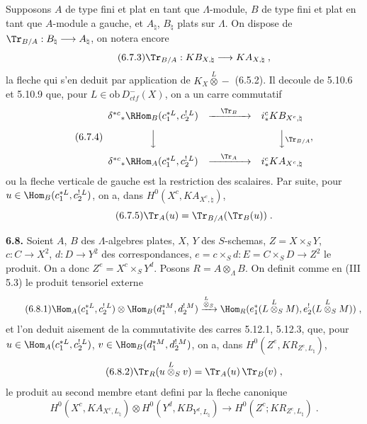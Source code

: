 Supposons $A$ de type fini et plat en tant que $\Lambda$-module, $B$ de type fini et plat en tant que $A$-module a gauche, et $A_\natural$, $B_\natural$ plats sur $\Lambda$. On dispose de $\Tr_{B/A} : B_\natural \longrightarrow A_\natural$, on notera encore
\begin{equation}\tag{6.7.3}
\Tr_{B/A} : KB_{X,\natural} \longrightarrow KA_{X,\natural}\;,
\end{equation}
la fleche qui s'en deduit par application de $K_X \overset{L}{\otimes} -$ (6.5.2). Il decoule de 5.10.6 et 5.10.9 que, pour $L \in \mathrm{ob}\, D_{ctf}^-(X)$, on a un carre commutatif
\begin{equation}\tag{6.7.4}
\begin{array}{ccc}
\delta^{*c}{}_*\RHom_B(c_1^{*L}, c_2^{!\,L}) & \xrightarrow{\quad\Tr_B\quad} & i_*^c KB_{X^c,\natural} \\[8pt]
\Big\downarrow & & \Big\downarrow \rlap{$\scriptstyle\Tr_{B/A}$} \\[8pt]
\delta^{*c}{}_*\RHom_A(c_1^{*L}, c_2^{!\,L}) & \xrightarrow{\quad\Tr_A\quad} & i_*^c KA_{X^c,\natural}
\end{array}\;,
\end{equation}
ou la fleche verticale de gauche est la restriction des scalaires. Par suite, pour $u \in \Hom_B(c_1^{*L}, c_2^{!\,L})$, on a, dans $H^0(X^c, KA_{X^c,\natural})$,
\begin{equation}\tag{6.7.5}
\Tr_A(u) = \Tr_{B/A}(\Tr_B(u))\;.
\end{equation}

\medskip
\noindent\textbf{6.8.} Soient $A$, $B$ des $\Lambda$-algebres plates, $X$, $Y$ des $S$-schemas, $Z = X \times_S Y$, $c : C \longrightarrow X^2$, $d : D \longrightarrow Y^2$ des correspondances, $e = c \times_S d : E = C \times_S D \rightarrow Z^2$ le produit. On a donc $Z^e = X^c \times_S Y^d$. Posons $R = A \otimes_\Lambda B$. On definit comme en (III 5.3) le produit tensoriel externe
\begin{equation}\tag{6.8.1}
\Hom_A(c_1^{*L}, c_2^{!\,L}) \otimes \Hom_B(d_1^{*M}, d_2^{!\,M}) \xrightarrow{\overset{L}{\otimes}_S} \Hom_R(e_1^{*}(L \overset{L}{\otimes}_S M), e_2^{!\,}(L \overset{L}{\otimes}_S M))\;,
\end{equation}
et l'on deduit aisement de la commutativite des carres 5.12.1, 5.12.3, que, pour $u \in \Hom_A(c_1^{*L}, c_2^{!\,L})$, $v \in \Hom_B(d_1^{*M}, d_2^{!\,M})$, on a, dans $H^0(Z^e, KR_{Z^c,L_\natural})$,
\begin{equation}\tag{6.8.2}
\Tr_R(u \overset{L}{\otimes}_S v) = \Tr_A(u)\,\Tr_B(v)\;,
\end{equation}
le produit au second membre etant defini par la fleche canonique
\begin{equation}\tag{6.8.3}
H^0(X^c, KA_{X^c,L_\natural}) \otimes H^0(Y^d, KB_{Y^d,L_\natural}) \longrightarrow H^0(Z^c; KR_{Z^c,L_\natural})\;.
\end{equation}

